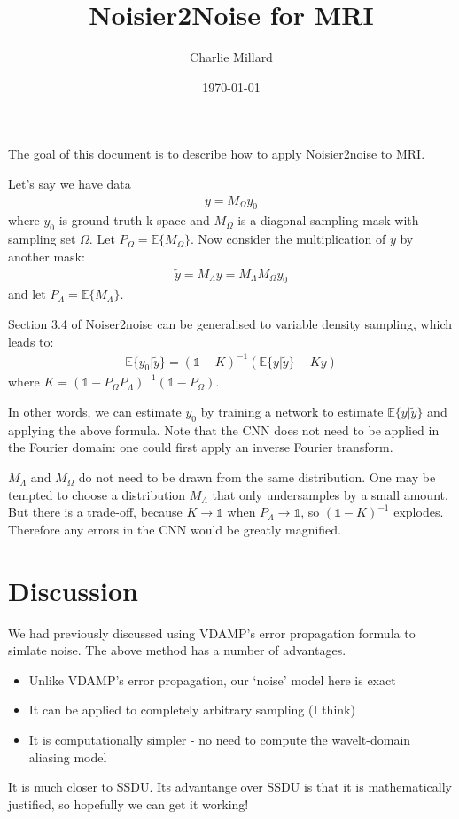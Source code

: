 \documentclass[12pt]{article}
\title{Noisier2Noise for MRI}
\author{Charlie Millard}
\date{\today}
\theoremstyle{plain}
\theoremstyle{definition}
\begin{document}
\maketitle
The goal of this document is to describe how to apply Noisier2noise to MRI.

Let's say we have data 
\begin{align}
	y = M_\Omega y_0
\end{align}
where $y_0$ is ground truth k-space and $M_\Omega$ is a diagonal sampling mask with sampling set $\Omega$. Let $P_\Omega = \mathds{E}\{M_\Omega\}$. Now consider the multiplication of $y$ by another mask: 
\begin{align}
	\widetilde{y} = M_\Lambda y = M_\Lambda M_\Omega y_0
\end{align}
and let $P_\Lambda = \mathds{E}\{M_\Lambda\}$. 

Section 3.4 of Noiser2noise can be generalised to variable density sampling, which leads to:
\begin{align}
	\mathds{E}\{ y_0 | \widetilde{y} \} = (\mathds{1} - K)^{-1} (\mathds{E}\{ y | \widetilde{y}\} - K y) 
\end{align}
where $K =  (\mathds{1} - P_\Omega P_\Lambda)^{-1}(\mathds{1} - P_\Omega)$. 

In other words, we can estimate $y_0$ by training a network to estimate $\mathds{E}\{ y | \widetilde{y}\}$ and applying the above formula. Note that the CNN does not need to be applied in the Fourier domain: one could first apply an inverse Fourier transform.

$M_\Lambda$ and $M_\Omega$ do not need to be drawn from the same distribution. One may be tempted to choose a distribution $M_\Lambda$ that only undersamples by a small amount. But there is a trade-off, because $K \rightarrow \mathds{1}$ when $P_\Lambda \rightarrow \mathds{1}$, so $(\mathds{1} - K)^{-1}$ explodes. Therefore any errors in the CNN would be greatly magnified. 

\section{Discussion}

We had previously discussed using VDAMP's error propagation formula to simlate noise. The above method has a number of advantages. 
\begin{itemize}
\item Unlike VDAMP's error propagation, our `noise' model here is exact 
\item It can be applied to completely arbitrary sampling (I think)
\item It is computationally simpler - no need to compute the wavelt-domain aliasing model
\end{itemize}

It is much closer to SSDU. Its advantange over SSDU is that it is mathematically justified, so hopefully we can get it working!
\end{document}
